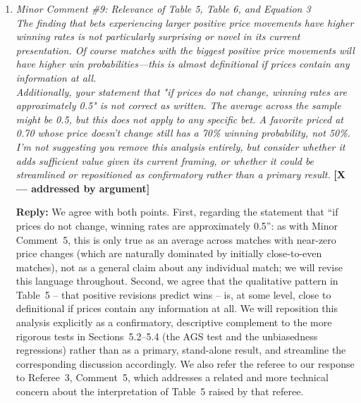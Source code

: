 \documentclass[letterpaper,12pt]{article}
\newcounter{b}
\newcommand{\argX}{\textcolor{green!55!black}{\textbf{[X --- addressed by argument]}}}
\newcommand{\Reply}[1]{\par\noindent\textbf{Reply:} #1}
\begin{document}
\begin{enumerate}
\Reply{We will add discussion providing intuition for the cross-sectional variation in closing-price forecast-error variance documented in Table~7. Plausible contributors include differences in per-bookmaker sample size (smaller books are more susceptible to sampling noise in a variance estimate), differences in the composition of matches and competitions each bookmaker covers, and differences in position-taking versus balanced-book strategies across bookmakers (see also our response to Minor Comment~6). We will note explicitly that, given the relatively small inter-bookmaker variance components already reported alongside our random-effects models (Tables~2--3 and~6), our substantive conclusions rest primarily on the aggregate, pooled results, and that bookmaker-specific patterns such as 10Bet's should be read as descriptive rather than as robust structural differences.}

\item \textit{Minor Comment \#9: Relevance of Table 5, Table 6, and Equation 3\\[6pt]
The finding that bets experiencing larger positive price movements have higher winning rates is not particularly surprising or novel in its current presentation. Of course matches with the biggest positive price movements will have higher win probabilities—this is almost definitional if prices contain any information at all.\\[6pt]
Additionally, your statement that "if prices do not change, winning rates are approximately 0.5" is not correct as written. The average across the sample might be 0.5, but this does not apply to any specific bet. A favorite priced at 0.70 whose price doesn't change still has a 70\% winning probability, not 50\%.\\[6pt]
I'm not suggesting you remove this analysis entirely, but consider whether it adds sufficient value given its current framing, or whether it could be streamlined or repositioned as confirmatory rather than a primary result.} \argX

\Reply{We agree with both points. First, regarding the statement that ``if prices do not change, winning rates are approximately 0.5'': as with Minor Comment~5, this is only true as an average across matches with near-zero price changes (which are naturally dominated by initially close-to-even matches), not as a general claim about any individual match; we will revise this language throughout. Second, we agree that the qualitative pattern in Table~5 -- that positive revisions predict wins -- is, at some level, close to definitional if prices contain any information at all. We will reposition this analysis explicitly as a confirmatory, descriptive complement to the more rigorous tests in Sections~5.2--5.4 (the AGS test and the unbiasedness regressions) rather than as a primary, stand-alone result, and streamline the corresponding discussion accordingly. We also refer the referee to our response to Referee~3, Comment~5, which addresses a related and more technical concern about the interpretation of Table~5 raised by that referee.}


\end{enumerate}
\end{document}
